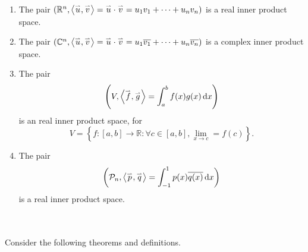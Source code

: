         \begin{enumerate}
            \item The pair \((\mathbb{R}^n, \left\langle \overset{_{\rightharpoonup}}{u},\overset{_{\rightharpoonup}}{v}\right\rangle=\overset{_{\rightharpoonup}}{u}\cdot\overset{_{\rightharpoonup}}{v}=u_1v_1+\cdots+u_nv_n)\) is a real inner product space.
            \item The pair \((\mathbb{C}^n, \left\langle \overset{_{\rightharpoonup}}{u},\overset{_{\rightharpoonup}}{v}\right\rangle=\overset{_{\rightharpoonup}}{u}\cdot\overset{_{\rightharpoonup}}{v}=u_1\overline{v_1}+\cdots+u_n\overline{v_n})\) is a complex inner product space.
            \item The pair 
                \begin{equation*}
                    \left(V,\left\langle \overset{_{\rightharpoonup}}{f},\overset{_{\rightharpoonup}}{g}\right\rangle=\int_a^b f(x)g(x)\,\text{d} x\right)
                \end{equation*}
                is an real inner product space, for 
                \begin{equation*}
                    V=\left\{f:[a,b]\to\mathbb{R}:\forall c\in[a,b], \lim_{x\to c}=f(c)\right\}.
                \end{equation*}
            \item The pair
            \begin{equation*}
                \left(\mathcal{P}_n,\left\langle \overset{_{\rightharpoonup}}{p},\overset{_{\rightharpoonup}}{q}\right\rangle=\int_{-1}^1 p(x)\overline{q(x)}\,\text{d} x\right)
            \end{equation*}
            is a real inner product space.
        \end{enumerate}
        \pagebreak
        \vphantom
        \\
        \\
        Consider the following theorems and definitions.
